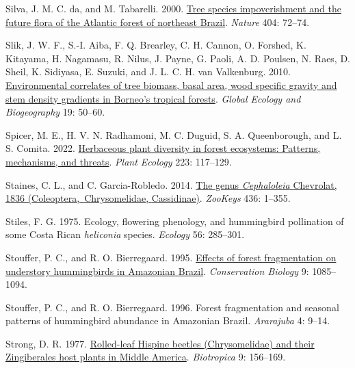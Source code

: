 \documentclass[
  12pt,
  man, donotrepeattitle,floatsintext]{apa6}
\newlength{\cslhangindent}
\newlength{\cslentryspacingunit} %
\newenvironment{CSLReferences}[2] %
 {%
  \setlength{\parindent}{0pt}
  \ifodd #1
  \let\oldpar\par
  \def\par{\hangindent=\cslhangindent\oldpar}
  \fi
  \setlength{\parskip}{#2\cslentryspacingunit}
 }%
 {}
\begin{document}
\begin{CSLReferences}{1}{0}
\leavevmode{}%
Silva, J. M. C. da, and M. Tabarelli. 2000. \href{https://doi.org/10.1038/35003563}{Tree species impoverishment and the future flora of the {Atlantic} forest of northeast {Brazil}}. \emph{Nature} 404: 72--74.

\leavevmode{}%
Slik, J. W. F., S.-I. Aiba, F. Q. Brearley, C. H. Cannon, O. Forshed, K. Kitayama, H. Nagamasu, R. Nilus, J. Payne, G. Paoli, A. D. Poulsen, N. Raes, D. Sheil, K. Sidiyasa, E. Suzuki, and J. L. C. H. van Valkenburg. 2010. \href{https://doi.org/10.1111/j.1466-8238.2009.00489.x}{Environmental correlates of tree biomass, basal area, wood specific gravity and stem density gradients in {Borneo}'s tropical forests}. \emph{Global Ecology and Biogeography} 19: 50--60.

\leavevmode{}%
Spicer, M. E., H. V. N. Radhamoni, M. C. Duguid, S. A. Queenborough, and L. S. Comita. 2022. \href{https://doi.org/10.1007/s11258-021-01202-9}{Herbaceous plant diversity in forest ecosystems: Patterns, mechanisms, and threats}. \emph{Plant Ecology} 223: 117--129.

\leavevmode{}%
Staines, C. L., and C. Garcia-Robledo. 2014. \href{https://doi.org/10.3897/zookeys.436.5766}{The genus \emph{{Cephaloleia}} {Chevrolat}, 1836 ({Coleoptera},~{Chrysomelidae}, {Cassidinae})}. \emph{ZooKeys} 436: 1--355.

\leavevmode{}%
Stiles, F. G. 1975. Ecology, flowering phenology, and hummingbird pollination of some {Costa} {Rican} \emph{heliconia} species. \emph{Ecology} 56: 285--301.

\leavevmode{}%
Stouffer, P. C., and R. O. Bierregaard. 1995. \href{https://www.jstor.org/stable/2387046}{Effects of forest fragmentation on understory hummingbirds in {Amazonian} {Brazil}}. \emph{Conservation Biology} 9: 1085--1094.

\leavevmode{}%
Stouffer, P. C., and R. O. Bierregaard. 1996. Forest fragmentation and seasonal patterns of hummingbird abundance in {Amazonian} {Brazil}. \emph{Ararajuba} 4: 9--14.

\leavevmode{}%
Strong, D. R. 1977. \href{https://doi.org/10.2307/2387878}{Rolled-leaf {Hispine} beetles ({Chrysomelidae}) and their {Zingiberales} host plants in {Middle} {America}}. \emph{Biotropica} 9: 156--169.


\end{CSLReferences}
\end{document}
